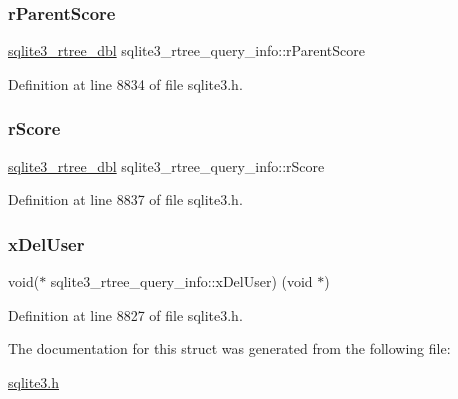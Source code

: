 \mbox{\label{structsqlite3__rtree__query__info_af7da93e7fc405eec7e7ec90ab237eab2}} 
\subsubsection{\texorpdfstring{r\+Parent\+Score}{rParentScore}}
{\footnotesize\ttfamily \mbox{\hyperlink{sqlite3_8h_ae9156ff58620c1ceae9391f1afabae1b}{sqlite3\+\_\+rtree\+\_\+dbl}} sqlite3\+\_\+rtree\+\_\+query\+\_\+info\+::r\+Parent\+Score}



Definition at line 8834 of file sqlite3.\+h.

\mbox{\label{structsqlite3__rtree__query__info_af449e4a3607573d17b3d31c67b6e1584}} 
\subsubsection{\texorpdfstring{r\+Score}{rScore}}
{\footnotesize\ttfamily \mbox{\hyperlink{sqlite3_8h_ae9156ff58620c1ceae9391f1afabae1b}{sqlite3\+\_\+rtree\+\_\+dbl}} sqlite3\+\_\+rtree\+\_\+query\+\_\+info\+::r\+Score}



Definition at line 8837 of file sqlite3.\+h.

\mbox{\label{structsqlite3__rtree__query__info_a23bcc6df883995d42d65449a27f45f85}} 
\subsubsection{\texorpdfstring{x\+Del\+User}{xDelUser}}
{\footnotesize\ttfamily void($\ast$ sqlite3\+\_\+rtree\+\_\+query\+\_\+info\+::x\+Del\+User) (void $\ast$)}



Definition at line 8827 of file sqlite3.\+h.



The documentation for this struct was generated from the following file\+:\begin{DoxyCompactItemize}
\item 
\mbox{\hyperlink{sqlite3_8h}{sqlite3.\+h}}\end{DoxyCompactItemize}
